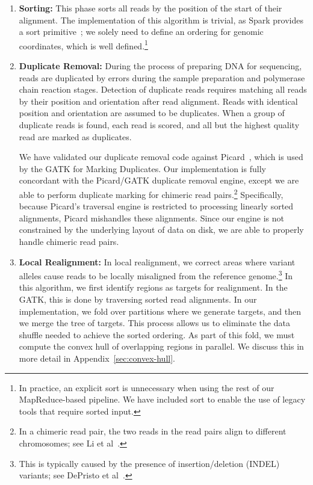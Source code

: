 \documentclass[10pt]{report} %
\begin{document}
\begin{enumerate}
\item \textbf{Sorting:} This phase sorts all reads by the position of the start of their alignment. The implementation
of this algorithm is trivial, as Spark provides a sort primitive~\cite{zaharia10}; we solely need to define an
ordering for genomic coordinates, which is well defined.\footnote{In practice, an explicit sort is unnecessary when
using the rest of our MapReduce-based pipeline. We have included sort to enable the use of legacy tools that
require sorted input.}
\item \textbf{Duplicate Removal:} During the process of preparing DNA for sequencing, reads are duplicated by
errors during the sample preparation and polymerase chain reaction stages. Detection of duplicate reads
requires matching all reads by their position and orientation after read alignment. Reads with identical position
and orientation are assumed to be duplicates. When a group of duplicate reads is found, each read is scored,
and all but the highest quality read are marked as duplicates.

We have validated our duplicate removal code against Picard~\cite{picard}, which is used by the GATK
for Marking Duplicates. Our implementation is fully concordant with the Picard/GATK duplicate removal
engine, except we are able to perform duplicate marking for chimeric read pairs.\footnote{In a chimeric read pair,
the two reads in the read pairs align to different chromosomes; see Li et al~\cite{li10}.}
Specifically, because Picard's traversal engine is restricted to processing linearly sorted alignments,
Picard mishandles these alignments. Since our engine is not constrained by the underlying layout of data
on disk, we are able to properly handle chimeric read pairs.
\item \textbf{Local Realignment:} In local realignment, we correct areas where variant alleles cause reads to be
locally misaligned from the reference genome.\footnote{This is typically caused by the presence of
insertion/deletion (INDEL) variants; see DePristo et al~\cite{depristo11}.} In this algorithm, we first identify regions
as targets for realignment. In the GATK, this is done by traversing sorted read alignments. In our implementation,
we fold over partitions where we generate targets, and then we merge the tree of targets. This process allows us
to eliminate the data shuffle needed to achieve the sorted ordering. As part of this fold, we must
compute the convex hull of overlapping regions in parallel. We discuss this in more detail in
Appendix~\ref{sec:convex-hull}.


\end{enumerate}
\end{document}
